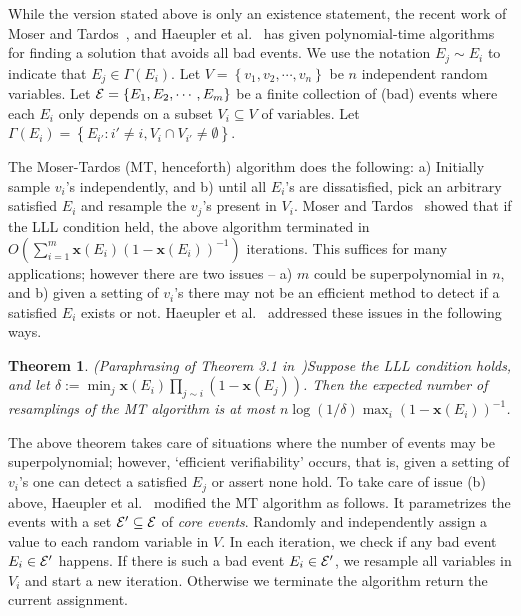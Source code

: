 \documentclass[11pt]{article}
\newtheorem{theorem}{Theorem} \newtheorem{lemma}{Lemma}[section]
\newcommand{\set}[1]{\left\{#1\right\}}
\newcommand{\x}{{\mathbf x}}
\begin{document}
While the version stated above is only an existence statement, the recent work of Moser and Tardos~\cite{MT10}, and Haeupler et al.~\cite{HSS11} has given polynomial-time algorithms for finding a solution that avoids all bad events. We  use the notation $E_j \sim E_i$ to indicate that $E_j \in \Gamma(E_i)$.
Let $V = \set{v_1, v_2, \cdots, v_n}$ be $n$ independent random variables. Let ${\cal E} = \set{E_1, E_2, \cdots, E_m}$ be a finite collection of (bad) events where each $E_i$ only depends on a subset $V_i \subseteq V$ of variables.   Let $\Gamma(E_i) = \set{E_{i'}: i' \neq i, V_i \cap V_{i'} \neq \emptyset}$.  

The Moser-Tardos (MT, henceforth) algorithm does the following: a) Initially sample $v_i$'s independently, and b) until all $E_i$'s are dissatisfied, pick an arbitrary satisfied $E_i$ and resample the $v_j$'s present in $V_i$.
Moser and Tardos~\cite{MT10} showed that if the LLL condition held, the above algorithm terminated in $O\left(\sum_{i=1}^m \x(E_i)(1-\x(E_i))^{-1}\right)$ iterations. 
This suffices for many applications; however there are two issues -- a) $m$ could be superpolynomial in $n$, and b) given a setting of $v_i$'s there may not be an efficient method to detect if a satisfied $E_i$ exists or not.
Haeupler et al.~\cite{HSS11} addressed these issues in the following ways. 

\begin{theorem}(Paraphrasing of Theorem 3.1 in~\cite{HSS11})\label{thm:hss-1}
Suppose the LLL condition holds, and let $\delta := \min_{j} \x(E_i)\prod_{j\sim i} (1-\x(E_j))$. Then the expected number of resamplings of the MT algorithm is at most 
$n\log(1/\delta)\max_i (1-\x(E_i))^{-1}$.
\end{theorem}

The above theorem takes care of situations where the number of events may be superpolynomial; however, `efficient verifiability' occurs, that is, given a setting of $v_i$'s one can detect a satisfied  $E_j$ or assert none hold.
To take care of issue (b) above, Haeupler et al.~\cite{HSS11} modified the MT algorithm as follows. It parametrizes the events 
with a set ${\cal E}' \subseteq {\cal E}$ of {\em core events}. Randomly and independently assign a value to each random variable in $V$.  In each iteration, we check if any bad event $E_i \in {\cal E}'$ happens. If there is such a bad event $E_i \in {\cal E}'$, we resample all variables in $V_i$ and start a new iteration. Otherwise we terminate the algorithm return the current assignment.  
\end{document}
